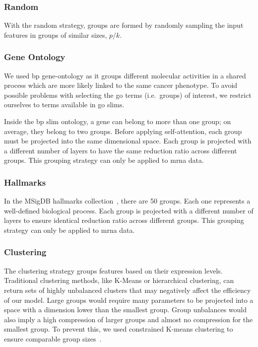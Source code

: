 \documentclass[../main.tex]{subfiles}
\begin{document}
\subsubsection{Random}
With the random strategy, groups are formed by randomly sampling the input features in groups of similar sizes, $p/k$.

\subsubsection{Gene Ontology}
We used \gls{bp} gene-ontology as it groups different molecular activities in a shared process which are more likely linked to the same cancer phenotype.
To avoid possible problems with selecting the \gls{go} terms (i.e.\ groups) of interest, we restrict ourselves to terms available in \gls{go} slims.

Inside the \gls{bp} slim ontology, a gene can belong to more than one group; on average, they belong to two groups.
Before applying self-attention, each group must be projected into the same dimensional space.
Each group is projected with a different number of layers to have the same reduction ratio across different groups. This grouping strategy can only be applied to \gls{mrna} data.

\subsubsection{Hallmarks}
In the MSigDB hallmarks collection~\cite{Liberzon2015}, there are 50 groups.
Each one represents a well-defined biological process.
Each group is projected with a different number of layers to ensure identical reduction ratio across different groups. This grouping strategy can only be applied to \gls{mrna} data.

\subsubsection{Clustering}
The clustering strategy groups features based on their expression levels.
Traditional clustering methods, like K-Means or hierarchical clustering, can return sets of highly unbalanced clusters that may negatively affect the efficiency of our model.
Large groups would require many parameters to be projected into a space with a dimension lower than the smallest group.
Group unbalances would also imply a high compression of larger groups and almost no compression for the smallest group.
To prevent this, we used constrained K-means clustering to ensure comparable group sizes~\cite{bradleyConstrainedKMeansClustering}.
\end{document}
